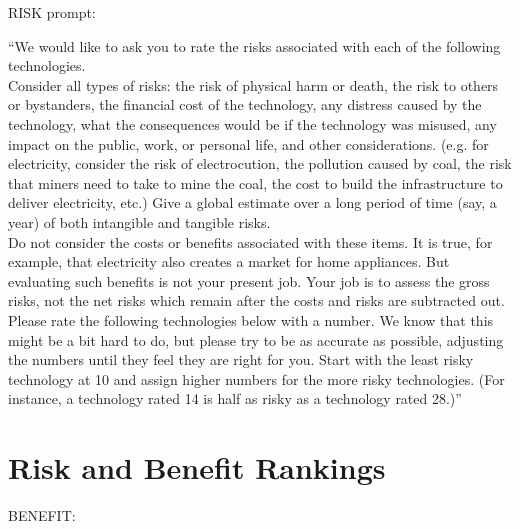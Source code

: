 \documentclass{acm_proc_article-sp}
\begin{document}
RISK prompt:

``We would like to ask you to rate the risks associated with each of the following technologies. \\[-.6cm]

Consider all types of risks: the risk of physical harm or death, the risk to others or bystanders, the financial cost of the technology, any distress caused by the technology, what the consequences would be if the technology was misused, any impact on the public, work, or personal life, and other considerations. (e.g. for electricity, consider the risk of electrocution, the pollution caused by coal, the risk that miners need to take to mine the coal, the cost to build the infrastructure to deliver electricity, etc.) Give a global estimate over a long period of time (say, a year) of both intangible and tangible risks. \\[-.6cm]

Do not consider the costs or benefits associated with these items. It is true, for example, that electricity also creates a market for home appliances. But evaluating such benefits is not your present job. Your job is to assess the gross risks, not the net risks which remain after the costs and risks are subtracted out.\\[-.6cm]

Please rate the following technologies below with a number. We know that this might be a bit hard to do, but please try to be as accurate as possible, adjusting the numbers until they feel they are right for you. Start with the least risky technology at 10 and assign higher numbers for the more risky technologies. (For instance, a technology rated 14 is half as risky as a technology rated 28.)''

\section{Risk and Benefit Rankings}
\label{sec:techrank}

BENEFIT: 
\end{document}
